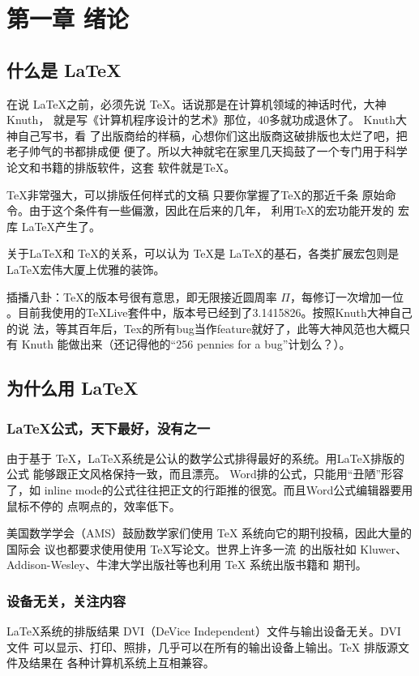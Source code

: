 \chapter{第一章 绪论}
\label{cha:intro}
\section{什么是 \LaTeX }
在说 \LaTeX \cite{companion}之前，必须先说 \TeX \cite{tex}。话说那是在计算机领域的神话时代，大神Knuth，
就是写《计算机程序设计的艺术》那位，40多就功成退休了。 Knuth大神自己写书，看
了出版商给的样稿，心想你们这出版商这破排版也太烂了吧，把老子帅气的书都排成便
便了。所以大神就宅在家里几天捣鼓了一个专门用于科学论文和书籍的排版软件，这套
软件就是\TeX。

\TeX 非常强大，可以排版任何样式的文稿 \pozhehao 只要你掌握了\TeX 的那近千条
原始命令。由于这个条件有一些偏激，因此在后来的几年， 利用\TeX 的宏功能开发的
宏库 \LaTeX 产生了。

关于\LaTeX 和 \TeX 的关系，可以认为 \TeX 是 \LaTeX 的基石，各类扩展宏包则是
\LaTeX 宏伟大厦上优雅的装饰。

插播八卦：\TeX 的版本号很有意思，即无限接近圆周率 $\Pi$，每修订一次增加一位
。目前我使用的TeXLive套件中，版本号已经到了3.1415826。按照Knuth大神自己的说
法，等其百年后，Tex的所有bug当作feature就好了，此等大神风范也大概只有 Knuth
能做出来（还记得他的“256 pennies for a bug”计划么？）。

\section{为什么用 \LaTeX }
\subsection{\LaTeX 公式，天下最好，没有之一}
\label{subsec:best-formula}
由于基于 \TeX ，\LaTeX 系统是公认的数学公式排得最好的系统。用LaTeX排版的公式
能够跟正文风格保持一致，而且漂亮。 Word排的公式，只能用“丑陋”形容了，如
inline mode的公式往往把正文的行距推的很宽。而且Word公式编辑器要用鼠标不停的
点啊点的，效率低下。

美国数学学会（AMS）鼓励数学家们使用 TeX 系统向它的期刊投稿，因此大量的国际会
议也都要求使用使用 TeX写论文\cite{acm-proceedings-templates}。世界上许多一流
的出版社如 Kluwer、Addison-Wesley、牛津大学出版社等也利用 TeX 系统出版书籍和
期刊。

\subsection{设备无关，关注内容} 
\LaTeX 系统的排版结果 DVI（DeVice Independent）文件与输出设备无关。DVI 文件
可以显示、打印、照排，几乎可以在所有的输出设备上输出。TeX 排版源文件及结果在
各种计算机系统上互相兼容。

